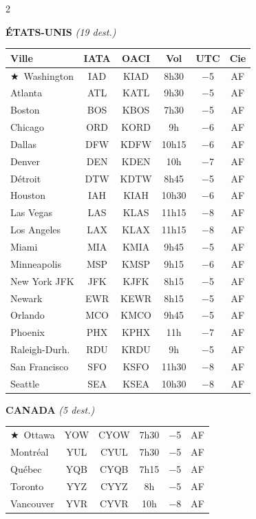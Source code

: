 \documentclass[9pt,a4paper,landscape]{article}
\newcommand{\CAP}{\textcolor{capgold}{$\bigstar$}}
\begin{document}
\begin{multicols}{2}
\scriptsize

\textbf{\color{ameror}ÉTATS-UNIS} \textit{(19 dest.)}\\[-0.1cm]
\begin{tabular}{@{}l c c c c c@{}}
\toprule
\textbf{Ville} & \textbf{IATA} & \textbf{OACI} & \textbf{Vol} & \textbf{UTC} & \textbf{Cie} \\
\midrule
\rowcolor{amerlight}\CAP\ Washington & IAD & KIAD & 8h30 & $-$5 & AF \\
Atlanta & ATL & KATL & 9h30 & $-$5 & AF \\
\rowcolor{amerlight} Boston & BOS & KBOS & 7h30 & $-$5 & AF \\
Chicago & ORD & KORD & 9h & $-$6 & AF \\
\rowcolor{amerlight} Dallas & DFW & KDFW & 10h15 & $-$6 & AF \\
Denver & DEN & KDEN & 10h & $-$7 & AF \\
\rowcolor{amerlight} Détroit & DTW & KDTW & 8h45 & $-$5 & AF \\
Houston & IAH & KIAH & 10h30 & $-$6 & AF \\
\rowcolor{amerlight} Las Vegas & LAS & KLAS & 11h15 & $-$8 & AF \\
Los Angeles & LAX & KLAX & 11h15 & $-$8 & AF \\
\rowcolor{amerlight} Miami & MIA & KMIA & 9h45 & $-$5 & AF \\
Minneapolis & MSP & KMSP & 9h15 & $-$6 & AF \\
\rowcolor{amerlight} New York JFK & JFK & KJFK & 8h15 & $-$5 & AF \\
Newark & EWR & KEWR & 8h15 & $-$5 & AF \\
\rowcolor{amerlight} Orlando & MCO & KMCO & 9h45 & $-$5 & AF \\
Phoenix & PHX & KPHX & 11h & $-$7 & AF \\
\rowcolor{amerlight} Raleigh-Durh. & RDU & KRDU & 9h & $-$5 & AF \\
San Francisco & SFO & KSFO & 11h30 & $-$8 & AF \\
\rowcolor{amerlight} Seattle & SEA & KSEA & 10h30 & $-$8 & AF \\
\bottomrule
\end{tabular}

\columnbreak

\textbf{\color{ameror}CANADA} \textit{(5 dest.)}\\[-0.1cm]
\begin{tabular}{@{}l c c c c c@{}}
\toprule
\rowcolor{amerlight}\CAP\ Ottawa & YOW & CYOW & 7h30 & $-$5 & AF \\
Montréal & YUL & CYUL & 7h30 & $-$5 & AF \\
\rowcolor{amerlight} Québec & YQB & CYQB & 7h15 & $-$5 & AF \\
Toronto & YYZ & CYYZ & 8h & $-$5 & AF \\
\rowcolor{amerlight} Vancouver & YVR & CYVR & 10h & $-$8 & AF \\
\bottomrule
\end{tabular}


\end{multicols}
\end{document}
